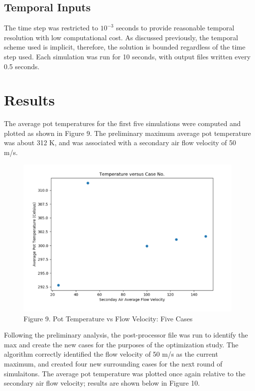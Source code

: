 \documentclass[3p,times,twocolumn]{elsarticle}
\begin{document}
\subsection{Temporal Inputs}
The time step was restricted to $10^{-3}$ seconds to provide reasonable temporal resolution with low computational cost. As discussed previously, the temporal scheme used is implicit, therefore, the solution is bounded regardless of the time step used. Each simulation was run for 10 seconds, with output files written every 0.5 seconds.

\section{Results}
The average pot temperatures for the first five simulations were computed and plotted as shown in Figure 9. The preliminary maximum average pot temperature was about 312 K, and was associated with a secondary air flow velocity of 50 m/s.

\begin{figure}{\linewidth}
	\includegraphics[width=\linewidth]{prelim.png}
	\caption{Figure 9. Pot Temperature vs Flow Velocity: Five Cases}
\end{figure}


Following the preliminary analysis, the post-processor file was run to identify the max and create the new cases for the purposes of the optimization study. The algorithm correctly identified the flow velocity of 50 m/s as the current maximum, and created four new surrounding cases for the next round of simulaitons. The average pot temperature was plotted once again relative to the secondary air flow velocity; results are shown below in Figure 10.
\end{document}
